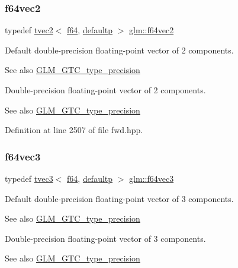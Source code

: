 \subsubsection{\texorpdfstring{f64vec2}{f64vec2}}
{\footnotesize\ttfamily typedef \mbox{\hyperlink{structglm_1_1tvec2}{tvec2}}$<$ \mbox{\hyperlink{group__gtc__type__precision_ga2bba392e555124b36cde6abba349bab3}{f64}}, \mbox{\hyperlink{namespaceglm_a0f04f086094c747d227af4425893f545a9d21ccd8b5a009ec7eb7677befc3bf51}{defaultp}} $>$ \mbox{\hyperlink{group__gtc__type__precision_gacde4fe7b129521888cd30672c34650c5}{glm\+::f64vec2}}}

Default double-\/precision floating-\/point vector of 2 components. \begin{DoxySeeAlso}{See also}
\mbox{\hyperlink{group__gtc__type__precision}{G\+L\+M\+\_\+\+G\+T\+C\+\_\+type\+\_\+precision}}
\end{DoxySeeAlso}
Double-\/precision floating-\/point vector of 2 components. \begin{DoxySeeAlso}{See also}
\mbox{\hyperlink{group__gtc__type__precision}{G\+L\+M\+\_\+\+G\+T\+C\+\_\+type\+\_\+precision}} 
\end{DoxySeeAlso}


Definition at line 2507 of file fwd.\+hpp.

\mbox{\label{group__gtc__type__precision_gac531875c6544b7919f36a86cbe538736}} 
\subsubsection{\texorpdfstring{f64vec3}{f64vec3}}
{\footnotesize\ttfamily typedef \mbox{\hyperlink{structglm_1_1tvec3}{tvec3}}$<$ \mbox{\hyperlink{group__gtc__type__precision_ga2bba392e555124b36cde6abba349bab3}{f64}}, \mbox{\hyperlink{namespaceglm_a0f04f086094c747d227af4425893f545a9d21ccd8b5a009ec7eb7677befc3bf51}{defaultp}} $>$ \mbox{\hyperlink{group__gtc__type__precision_gac531875c6544b7919f36a86cbe538736}{glm\+::f64vec3}}}

Default double-\/precision floating-\/point vector of 3 components. \begin{DoxySeeAlso}{See also}
\mbox{\hyperlink{group__gtc__type__precision}{G\+L\+M\+\_\+\+G\+T\+C\+\_\+type\+\_\+precision}}
\end{DoxySeeAlso}
Double-\/precision floating-\/point vector of 3 components. \begin{DoxySeeAlso}{See also}
\mbox{\hyperlink{group__gtc__type__precision}{G\+L\+M\+\_\+\+G\+T\+C\+\_\+type\+\_\+precision}} 
\end{DoxySeeAlso}


